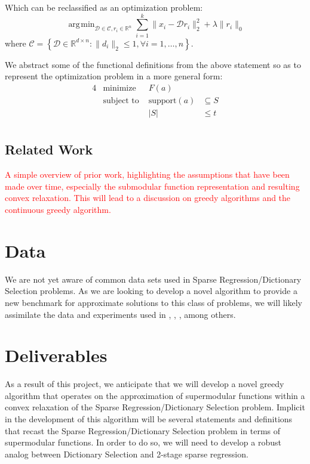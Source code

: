 \documentclass{article}
\newcommand{\R}{\mathbb{R}}
\DeclareMathOperator*{\argmin}{\arg\!\min}
\begin{document}
\noindent Which can be reclassified as an optimization problem: $$\argmin_{\mathcal{D}\in\mathcal{C}, r_i\in\R^n} \sum_{i=1}^k \|x_i - \mathcal{D}r_i\|_2^2 + \lambda\|r_i\|_0$$
where $\mathcal{C} = \left\{\mathcal{D}\in\R^{d \times n} : \|d_i\|_2 \leq 1, \forall i=1, \dots, n\right\}$.

\noindent We abstract some of the functional definitions from the above statement so as to represent the optimization problem in a more general form:
\begin{alignat*}{4}
    &\text{minimize }   & F(a) & \\
    &\text{subject to } & \text{support}(a)&\subseteq S\\
    &                   & |S|  &\leq t\\
\end{alignat*}
	

\subsection{Related Work}
\textcolor{red}{A simple overview of prior work, highlighting the assumptions that have been made over time, especially the submodular function representation and resulting convex relaxation. This will lead to a discussion on greedy algorithms and the continuous greedy algorithm.}

\section{Data}
We are not yet aware of common data sets used in Sparse Regression/Dictionary Selection problems. As we are looking to develop a novel algorithm to provide a new benchmark for approximate solutions to this class of problems, we will likely assimilate the data and experiments used in  \cite{submod_spectral}, \cite{greedy_selection}, \cite{rIBP}, among others. 

\section{Deliverables} \label{methods}
As a result of this project, we anticipate that we will develop a novel greedy algorithm that operates on the approximation of supermodular functions within a convex relaxation of the Sparse Regression/Dictionary Selection problem. Implicit in the development of this algorithm will be several statements and definitions that recast the Sparse Regression/Dictionary Selection problem in terms of supermodular functions. In order to do so, we will need to develop a robust analog between Dictionary Selection and 2-stage sparse regression.
\end{document}
